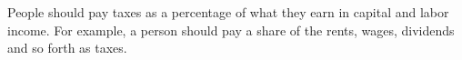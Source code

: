 People should pay taxes as a percentage of what they earn in capital and labor income.
For example, a person should pay a share of the rents, wages, dividends and so forth as taxes.